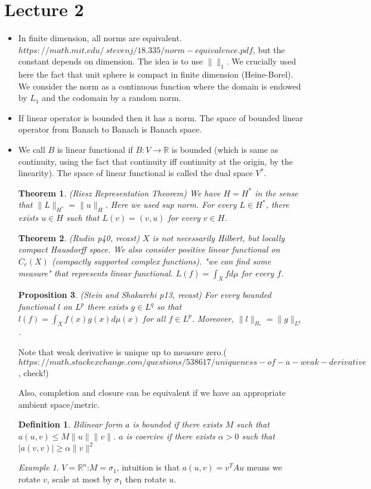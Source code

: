 \documentclass{article}
\newtheorem{theorem}{Theorem}
\newtheorem{proposition}[theorem]{Proposition}
\newtheorem{definition}{Definition}
\theoremstyle{remark}
\newtheorem{example}{Example}
\begin{document}
\section*{Lecture 2}
\begin{itemize}
\item In finite dimension, all norms are equivalent.
$https://math.mit.edu/~stevenj/18.335/norm-equivalence.pdf$, but the constant depends on dimension. The idea is to use $\lVert \rVert_1$. We crucially used here the fact that unit sphere is compact in finite dimension (Heine-Borel). We consider the norm as a continuous function where the domain is endowed by $L_1$ and the codomain by a random norm.
\item If linear operator is bounded then it has a norm. The space of bounded linear operator from Banach to Banach is Banach space.
\item We call $B$ is linear functional if $B:V\to\mathbb{R}$ is bounded (which is same as continuity, using the fact that continuity iff continuity at the origin, by the linearity). The space of linear functional is called the dual space $V^*$.
\begin{theorem} (Riesz Representation Theorem) We have $H=H^*$ in the sense that $\lVert L\rVert_{H^*}=\lVert u\rVert_H$. Here we used sup norm. For every $L\in H^*$, there exists $u\in H$ such that $L(v)=(v,u)$ for every $v\in H$.
\end{theorem}
\begin{theorem}
(Rudin p40, recast) $X$ is not necessarily Hilbert, but locally compact Hausdorff space. We also consider positive linear functional on $C_c (X)$ (compactly supported complex functions). "we can find some measure" that represents linear functional. $L(f)=\int_X f d\mu$ for every $f$.
\end{theorem}
\begin{proposition}
(Stein and Shakarchi p13, recast) For every bounded functional $l$ on $L^p$ there exists $g\in L^q$ so that $l(f)=\int_X f(x)g(x)d\mu (x)$ for all $f\in L^p$. Moreover, $\lVert l\rVert_{B_*}=\lVert g\rVert_{L^q}$.
\end{proposition}
Note that weak derivative is unique up to measure zero.($https://math.stackexchange.com/questions/538617/uniqueness-of-a-weak-derivative$, check!)

Also, completion and closure can be equivalent if we have an appropriate ambient space/metric.

\begin{definition}
Bilinear form $a$ is bounded if there exists $M$ such that $a(u,v)\leq M\lVert u\rVert\lVert v\rVert$. $a$ is coercive if there exists $\alpha>0$ such that $\lvert a(v,v)\rvert\geq\alpha\rVert v\rVert^2$
\end{definition}
\begin{example}
$V=\mathbb{R}^n$:$M=\sigma_1$, intuition is that $a(u,v)=v^T Au$ means we rotate $v$, scale at most by $\sigma_1$ then rotate $u$.


\end{example}
\end{itemize}
\end{document}
